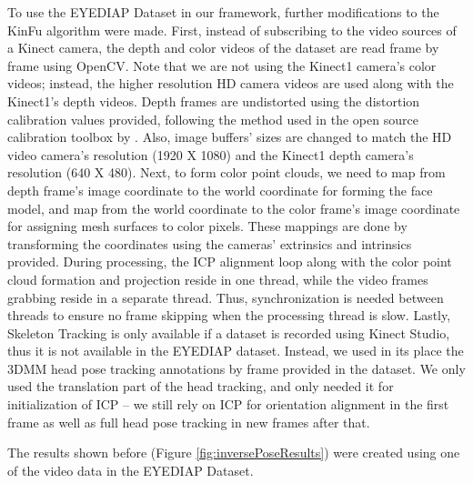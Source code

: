 To use the EYEDIAP Dataset in our framework, further modifications to the KinFu algorithm were made.  First, instead of subscribing to the video sources of a Kinect camera, the depth and color videos of the dataset are read frame by frame using OpenCV.  Note that we are not using the Kinect1 camera's color videos; instead, the higher resolution HD camera videos are used along with the Kinect1's depth videos.  Depth frames are undistorted using the distortion calibration values provided, following the method used in the open source calibration toolbox by \cite{herrera2012joint}.  Also, image buffers' sizes are changed to match the HD video camera's resolution (1920 X 1080) and the Kinect1 depth camera's resolution (640 X 480).  Next, to form color point clouds, we need to map from depth frame's image coordinate to the world coordinate for forming the face model, and map from the world coordinate to the color frame's image coordinate for assigning mesh surfaces to color pixels.  These mappings are done by transforming the coordinates using the cameras' extrinsics and intrinsics provided.  During processing, the ICP alignment loop along with the color point cloud formation and projection reside in one thread, while the video frames grabbing reside in a separate thread.  Thus, synchronization is needed between threads to ensure no frame skipping when the processing thread is slow.  Lastly, Skeleton Tracking is only available if a dataset is recorded using Kinect Studio, thus it is not available in the EYEDIAP dataset.  Instead, we used in its place the 3DMM head pose tracking annotations by frame provided in the dataset.  We only used the translation part of the head tracking, and only needed it for initialization of ICP -- we still rely on ICP for orientation alignment in the first frame as well as full head pose tracking in new frames after that.

The results shown before (Figure \ref{fig:inversePoseResults}) were created using one of the video data in the EYEDIAP Dataset.




